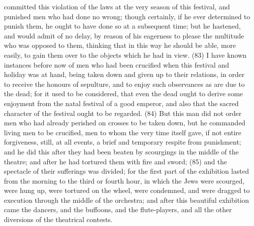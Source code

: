 committed this violation of the laws at the very season of this festival, and punished men who had
done no wrong; though certainly, if he ever determined to punish them, he ought to have done so at
a subsequent time; but he hastened, and would admit of no delay, by reason of his eagerness to
please the multitude who was opposed to them, thinking that in this way he should be able, more
easily, to gain them over to the objects which he had in view. (83) I have known instances before
now of men who had been crucified when this festival and holiday was at hand, being taken down
and given up to their relations, in order to receive the honours of sepulture, and to enjoy such
observances as are due to the dead; for it used to be considered, that even the dead ought to
derive some enjoyment from the natal festival of a good emperor, and also that the sacred
character of the festival ought to be regarded. (84) But this man did not order men who had already
perished on crosses to be taken down, but he commanded living men to be crucified, men to whom
the very time itself gave, if not entire forgiveness, still, at all events, a brief and temporary respite
from punishment; and he did this after they had been beaten by scourgings in the middle of the
theatre; and after he had tortured them with fire and sword; (85) and the spectacle of their
sufferings was divided; for the first part of the exhibition lasted from the morning to the third or
fourth hour, in which the Jews were scourged, were hung up, were tortured on the wheel, were
condemned, and were dragged to execution through the middle of the orchestra; and after this
beautiful exhibition came the dancers, and the buffoons, and the flute-players, and all the other
diversions of the theatrical contests.


